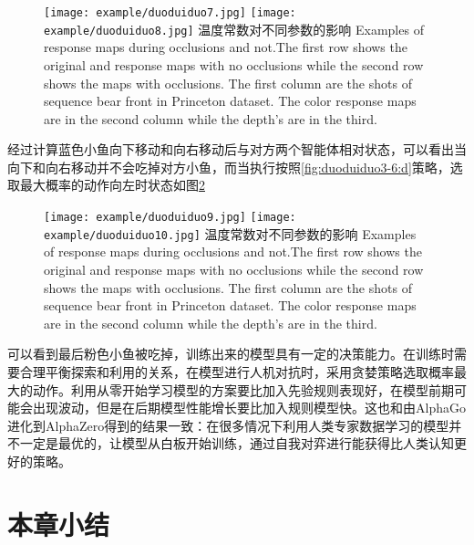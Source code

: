 \begin{figure}[!hpbt]
	\centering
	{\texttt{[image: example/duoduiduo7.jpg]}}
	\hspace{0.5em}
	{\texttt{[image: example/duoduiduo8.jpg]}}
	\bicaption
	{温度常数对不同参数的影响}
	{Examples of response maps during occlusions and not.The first row shows the original and response maps with no occlusions while the second row shows the maps with occlusions. The first column are the shots of sequence bear front in Princeton dataset. The color response maps are in the second column while the depth’s are in the third.}
	\label{fig2:duoduiduo}
\end{figure}
经过计算蓝色小鱼向下移动和向右移动后与对方两个智能体相对状态，可以看出当向下和向右移动并不会吃掉对方小鱼，而当执行按照\ref{fig:duoduiduo3-6:d}策略，选取最大概率的动作向左时状态如图\ref{fig3:duoduiduo}
\begin{figure}[!hpbt]
	\centering
	{\texttt{[image: example/duoduiduo9.jpg]}}
	\hspace{0.5em}
	{\texttt{[image: example/duoduiduo10.jpg]}}
	\bicaption
	{温度常数对不同参数的影响}
	{Examples of response maps during occlusions and not.The first row shows the original and response maps with no occlusions while the second row shows the maps with occlusions. The first column are the shots of sequence bear front in Princeton dataset. The color response maps are in the second column while the depth’s are in the third.}
	\label{fig3:duoduiduo}
\end{figure}
可以看到最后粉色小鱼被吃掉，训练出来的模型具有一定的决策能力。在训练时需要合理平衡探索和利用的关系，在模型进行人机对抗时，采用贪婪策略选取概率最大的动作。利用从零开始学习模型的方案要比加入先验规则表现好，在模型前期可能会出现波动，但是在后期模型性能增长要比加入规则模型快。这也和由AlphaGo进化到AlphaZero得到的结果一致：在很多情况下利用人类专家数据学习的模型并不一定是最优的，让模型从白板开始训练，通过自我对弈进行能获得比人类认知更好的策略。
\section{本章小结}


